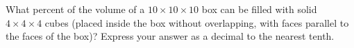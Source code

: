 What percent of the volume of a $10\times10\times10$ box can be filled with solid $4\times4\times4$ cubes (placed inside the box without overlapping, with faces parallel to the faces of the box)? Express your answer as a decimal to the nearest tenth.
